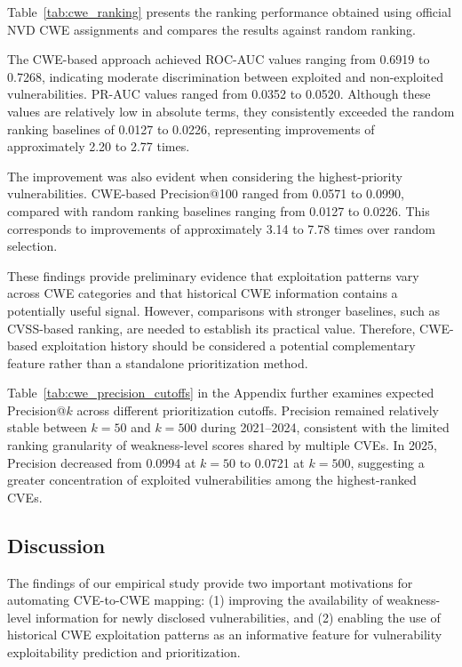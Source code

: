 \documentclass[conference,compsoc]{IEEEtran}
\begin{document}
Table~\ref{tab:cwe_ranking} presents the
ranking performance obtained using official
NVD CWE assignments and compares the results
against random ranking.

The CWE-based approach achieved ROC-AUC
values ranging from 0.6919 to 0.7268,
indicating moderate discrimination between
exploited and non-exploited vulnerabilities.
PR-AUC values ranged from 0.0352 to 0.0520.
Although these values are relatively low
in absolute terms, they consistently exceeded
the random ranking baselines of 0.0127
to 0.0226, representing improvements of
approximately 2.20 to 2.77 times.

The improvement was also evident when
considering the highest-priority vulnerabilities.
CWE-based Precision@100 ranged from 0.0571
to 0.0990, compared with random ranking
baselines ranging from 0.0127 to 0.0226.
This corresponds to improvements of
approximately 3.14 to 7.78 times over
random selection.

These findings provide preliminary evidence
that exploitation patterns vary across
CWE categories and that historical CWE
information contains a potentially useful
signal. However, comparisons with stronger
baselines, such as CVSS-based ranking,
are needed to establish its practical
value. Therefore, CWE-based exploitation
history should be considered a potential
complementary feature rather than a
standalone prioritization method.

Table~\ref{tab:cwe_precision_cutoffs}
in the Appendix further examines expected
Precision@$k$ across different prioritization
cutoffs. Precision remained relatively
stable between $k=50$ and $k=500$ during
2021--2024, consistent with the limited
ranking granularity of weakness-level scores
shared by multiple CVEs. In 2025,
Precision decreased from 0.0994 at $k=50$
to 0.0721 at $k=500$, suggesting a greater
concentration of exploited vulnerabilities
among the highest-ranked CVEs.

\subsection{Discussion}
\label{sec:empirical_discussion}

The findings of our empirical study provide two
important motivations for automating CVE-to-CWE
mapping: (1) improving the availability of
weakness-level information for newly disclosed
vulnerabilities, and (2) enabling the use of
historical CWE exploitation patterns as an
informative feature for vulnerability
exploitability prediction and prioritization.
\end{document}
